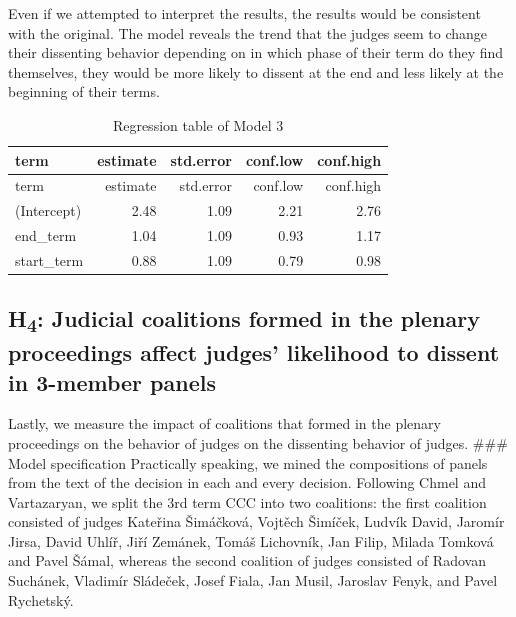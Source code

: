 \documentclass[
  11pt,
]{article}
\begin{document}
Even if we attempted to interpret the results, the results would be
consistent with the original. The model reveals the trend that the
judges seem to change their dissenting behavior depending on in which
phase of their term do they find themselves, they would be more likely
to dissent at the end and less likely at the beginning of their terms.

\begin{longtable}[]{@{}lrrrr@{}}
\caption{Regression table of Model 3}\tabularnewline
\toprule\noalign{}
term & estimate & std.error & conf.low & conf.high \\
\midrule\noalign{}
\endfirsthead
\toprule\noalign{}
term & estimate & std.error & conf.low & conf.high \\
\midrule\noalign{}
\endhead
\bottomrule\noalign{}
\endlastfoot
(Intercept) & 2.48 & 1.09 & 2.21 & 2.76 \\
end\_term & 1.04 & 1.09 & 0.93 & 1.17 \\
start\_term & 0.88 & 1.09 & 0.79 & 0.98 \\
\end{longtable}

\hypertarget{h4-judicial-coalitions-formed-in-the-plenary-proceedings-affect-judges-likelihood-to-dissent-in-3-member-panels}{%
\subsection{\texorpdfstring{H\textsubscript{4}: Judicial coalitions
formed in the plenary proceedings affect judges' likelihood to dissent
in 3-member
panels}{H4: Judicial coalitions formed in the plenary proceedings affect judges' likelihood to dissent in 3-member panels}}\label{h4-judicial-coalitions-formed-in-the-plenary-proceedings-affect-judges-likelihood-to-dissent-in-3-member-panels}}

Lastly, we measure the impact of coalitions that formed in the plenary
proceedings on the behavior of judges on the dissenting behavior of
judges. \#\#\# Model specification Practically speaking, we mined the
compositions of panels from the text of the decision in each and every
decision. Following Chmel and Vartazaryan, we split the 3rd term CCC
into two coalitions: the first coalition consisted of judges Kateřina
Šimáčková, Vojtěch Šimíček, Ludvík David, Jaromír Jirsa, David Uhlíř,
Jiří Zemánek, Tomáš Lichovník, Jan Filip, Milada Tomková and Pavel
Šámal, whereas the second coalition of judges consisted of Radovan
Suchánek, Vladimír Sládeček, Josef Fiala, Jan Musil, Jaroslav Fenyk, and
Pavel Rychetský.
\end{document}
